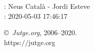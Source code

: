 \documentclass[11pt]{article}
\begin{document}
    \newcommand{\SampleTwoCol}{\SampleTwoColInputOutput{sample1}{}}
    \newcommand{\SampleOneCol}{\SampleOneColInputOutput{sample1}{}}

    \ProblemInformation
    \Author: Neus Català - Jordi Esteve\\    
    \Generation: 2020-05-03 17:46:17

    \bigskip

    \copyright\ \emph{Jutge.org}, 2006--2020. \\
    https:$/\!\!/$jutge.org
\end{document}
